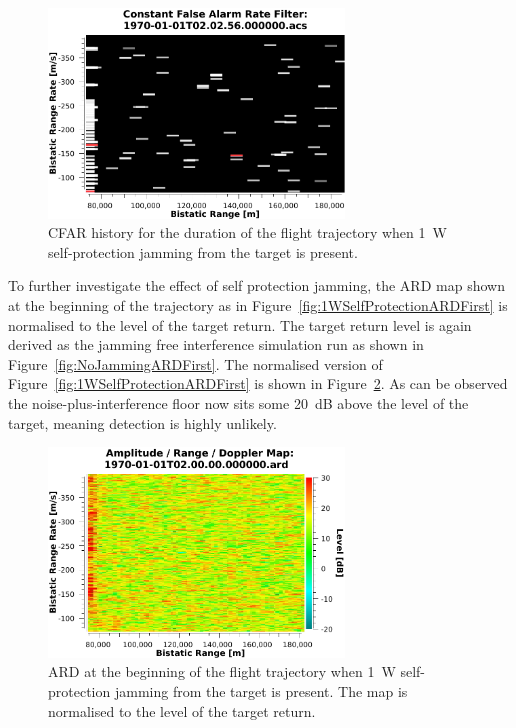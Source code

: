 \documentclass[english, 12pt]{report}
\begin{document}
\begin{figure}[htbp]
\begin{center}
\includegraphics[width=0.7\textwidth]{figs/Simulations/1WSelfProtectionCFAR.pdf}
\caption[CFAR 1~W self-protection jamming from the target. ]{CFAR history for the duration of the flight trajectory when 1~W self-protection jamming from the target is present.}
\label{fig:1WSelfProtectionCFAR}
\end{center}
\end{figure}

To further investigate the effect of self protection jamming, the ARD map shown at the beginning of the trajectory as in Figure~\ref{fig:1WSelfProtectionARDFirst} is normalised to the level of the target return. The target return level is again derived as the jamming free interference simulation run as shown in Figure~\ref{fig:NoJammingARDFirst}. The normalised version of Figure~\ref{fig:1WSelfProtectionARDFirst} is shown in Figure~\ref{fig:1WSelfProtectionARDFirst_targetNormalised}. As can be observed the noise-plus-interference floor now sits some 20~dB above the level of the target, meaning detection is highly unlikely.

\begin{figure}[htbp]
\begin{center}
\includegraphics[width=0.7\textwidth]{figs/Simulations/1WSelfProtectionARDFirstTargetNormalised.pdf}
\caption[ARD map normalised to target return.]{ARD at the beginning of the flight trajectory when 1~W self-protection jamming from the target is present. The map is normalised to the level of the target return.}
\label{fig:1WSelfProtectionARDFirst_targetNormalised}
\end{center}
\end{figure}
\end{document}
